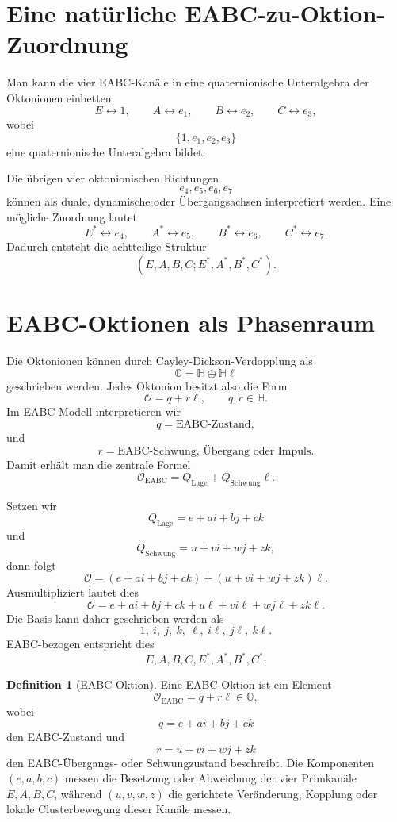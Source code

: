 \documentclass[11pt,a4paper]{article}
\theoremstyle{definition}
\newtheorem{definition}{Definition}[section]
\theoremstyle{plain}
\newcommand{\HH}{\mathbb{H}}
\newcommand{\OO}{\mathbb{O}}
\newcommand{\EABC}{\mathrm{EABC}}
\begin{document}
	\section{Eine natürliche EABC-zu-Oktion-Zuordnung}
	
	Man kann die vier EABC-Kanäle in eine quaternionische Unteralgebra der Oktonionen einbetten:
	\[
	E\leftrightarrow 1,
	\qquad
	A\leftrightarrow e_1,
	\qquad
	B\leftrightarrow e_2,
	\qquad
	C\leftrightarrow e_3,
	\]
	wobei
	\[
	\{1,e_1,e_2,e_3\}
	\]
	eine quaternionische Unteralgebra bildet.
	
	Die übrigen vier oktonionischen Richtungen
	\[
	e_4,e_5,e_6,e_7
	\]
	können als duale, dynamische oder Übergangsachsen interpretiert werden. Eine mögliche Zuordnung lautet
	\[
	E^\ast\leftrightarrow e_4,
	\qquad
	A^\ast\leftrightarrow e_5,
	\qquad
	B^\ast\leftrightarrow e_6,
	\qquad
	C^\ast\leftrightarrow e_7.
	\]
	Dadurch entsteht die achtteilige Struktur
	\[
	(E,A,B,C;E^\ast,A^\ast,B^\ast,C^\ast).
	\]
	
	\section{EABC-Oktionen als Phasenraum}
	
	Die Oktonionen können durch Cayley-Dickson-Verdopplung als
	\[
	\OO=\HH\oplus\HH\ell
	\]
	geschrieben werden. Jedes Oktonion besitzt also die Form
	\[
	\mathcal O=q+r\ell,
	\qquad
	q,r\in\HH.
	\]
	Im EABC-Modell interpretieren wir
	\[
	q=\text{EABC-Zustand},
	\]
	und
	\[
	r=\text{EABC-Schwung, Übergang oder Impuls}.
	\]
	Damit erhält man die zentrale Formel
	\[
	\boxed{
		\mathcal O_{\EABC}
		=
		Q_{\mathrm{Lage}}+Q_{\mathrm{Schwung}}\ell
	}.
	\]
	
	Setzen wir
	\[
	Q_{\mathrm{Lage}}=e+ai+bj+ck
	\]
	und
	\[
	Q_{\mathrm{Schwung}}=u+vi+wj+zk,
	\]
	dann folgt
	\[
	\mathcal O
	=
	(e+ai+bj+ck)+(u+vi+wj+zk)\ell.
	\]
	Ausmultipliziert lautet dies
	\[
	\mathcal O
	=
	e+ai+bj+ck+u\ell+v i\ell+w j\ell+z k\ell.
	\]
	Die Basis kann daher geschrieben werden als
	\[
	1,
	\ i,
	\ j,
	\ k,
	\ \ell,
	\ i\ell,
	\ j\ell,
	\ k\ell.
	\]
	EABC-bezogen entspricht dies
	\[
	E,A,B,C,E^\ast,A^\ast,B^\ast,C^\ast.
	\]
	
	\begin{definition}[EABC-Oktion]
		Eine EABC-Oktion ist ein Element
		\[
		\mathcal O_{\EABC}=q+r\ell\in\OO,
		\]
		wobei
		\[
		q=e+ai+bj+ck
		\]
		den EABC-Zustand und
		\[
		r=u+vi+wj+zk
		\]
		den EABC-Übergangs- oder Schwungzustand beschreibt. Die Komponenten $(e,a,b,c)$ messen die Besetzung oder Abweichung der vier Primkanäle $E,A,B,C$, während $(u,v,w,z)$ die gerichtete Veränderung, Kopplung oder lokale Clusterbewegung dieser Kanäle messen.
	\end{definition}
	
\end{document}
